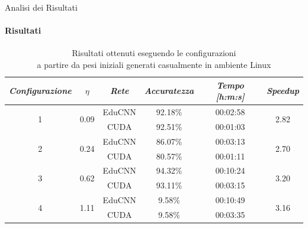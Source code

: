 \documentclass[
 ]{beamer}
\begin{document}
\begin{frame}{Analisi dei Risultati}
    \framesubtitle{Risultati}

         \begin{table}
            \centering
            \renewcommand\arraystretch{1.3}
            \small
            \begin{tabular}{| c | c | c | c | c | c |}
                \hline
                \emph{Configurazione} & $\eta$ & \emph{Rete} & \emph{Accuratezza} & \emph{Tempo [h:m:s]} & \emph{Speedup} \\
                \hline
                \multirow{2}{*}{1} & \multirow{2}{*}{0.09} & EduCNN & 92.18\% & 00:02:58 & \multirow{2}{*}{2.82} \\ \cline{3-5} 
                                   &                       & CUDA   & 92.51\% & 00:01:03  & \\
                \hline
                \multirow{2}{*}{2} & \multirow{2}{*}{0.24} & EduCNN & 86.07\% & 00:03:13 & \multirow{2}{*}{2.70} \\ \cline{3-5} 
                                   &                       & CUDA   & 80.57\% & 00:01:11 & \\
                \hline
                \multirow{2}{*}{3} & \multirow{2}{*}{0.62} & EduCNN & 94.32\% & 00:10:24 & \multirow{2}{*}{3.20} \\ \cline{3-5} 
                                   &                       & CUDA   & 93.11\% & 00:03:15 & \\
                \hline
                \multirow{2}{*}{4} & \multirow{2}{*}{1.11} & EduCNN & 9.58\% & 00:10:49 & \multirow{2}{*}{3.16} \\ \cline{3-5} 
                                   &                       & CUDA   & 9.58\% & 00:03:35 & \\
                \hline
            \end{tabular}
            \caption                        
    {Risultati ottenuti eseguendo le configurazioni \\ a partire da pesi iniziali generati casualmente in ambiente Linux \endtabular}          
        \end{table}    
\end{frame}
\end{document}
